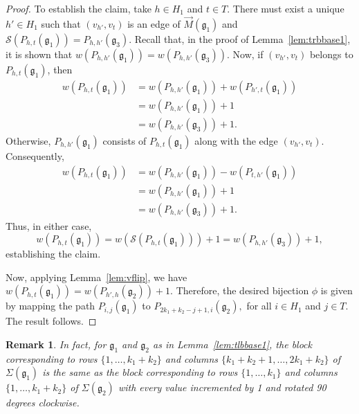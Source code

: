 \documentclass[letterpaper,10pt]{article}
\newtheorem{remark}[theorem]{Remark}
\begin{document}
\begin{proof}
To establish the claim, take $h\in H_1$ and $t\in T$. There must exist a unique $h'\in H_1$ such that $(v_{h'},v_t)$ is an edge of $\overrightarrow{M}(\mathfrak{g}_1)$ and $\mathcal{S}(P_{h,t}(\mathfrak{g}_1))=P_{h,h'}(\mathfrak{g}_3)$. Recall that, in the proof of Lemma~\ref{lem:trbbase1}, it is shown that $w(P_{h,h'}(\mathfrak{g}_1))=w(P_{h,h'}(\mathfrak{g}_3))$. Now, if $(v_{h'},v_t)$ belongs to $P_{h,t}(\mathfrak{g}_1)$, then 
\begin{align*}
    w(P_{h,t}(\mathfrak{g}_1))&=w(P_{h,h'}(\mathfrak{g}_1))+w(P_{h',t}(\mathfrak{g}_1))\\
    &=w(P_{h,h'}(\mathfrak{g}_1))+1\\
    &=w(P_{h,h'}(\mathfrak{g}_3))+1.
\end{align*}
Otherwise, $P_{h,h'}(\mathfrak{g}_1)$ consists of $P_{h,t}(\mathfrak{g}_1)$ along with the edge $(v_{h'},v_t)$. Consequently,
\begin{align*}
    w(P_{h,t}(\mathfrak{g}_1))&=w(P_{h,h'}(\mathfrak{g}_1))-w(P_{t,h'}(\mathfrak{g}_1))\\
    &=w(P_{h,h'}(\mathfrak{g}_1))+1\\
    &=w(P_{h,h'}(\mathfrak{g}_3))+1.
\end{align*}
Thus, in either case, $$w(P_{h,t}(\mathfrak{g}_1))=w(\mathcal{S}(P_{h,t}(\mathfrak{g}_1)))+1=w(P_{h,h'}(\mathfrak{g}_3))+1,$$ establishing the claim. 

Now, applying Lemma~\ref{lem:vflip}, we have $w(P_{h,t}(\mathfrak{g}_1))=w(P_{h',h}(\mathfrak{g}_2))+1$. Therefore, the desired bijection $\phi$ is given by mapping the path $P_{i,j}(\mathfrak{g}_1)$ to $P_{2k_1+k_2-j+1,i}(\mathfrak{g}_2),$ for all $i\in H_1$ and $j\in T.$ The result follows.
\end{proof}

\begin{remark}
In fact, for $\mathfrak{g}_1$ and $\mathfrak{g}_2$ as in Lemma~\ref{lem:tlbbase1}, the block corresponding to rows $\{1,\hdots,k_1+k_2\}$ and columns $\{k_1+k_2+1,\hdots,2k_1+k_2\}$ of $\Sigma(\mathfrak{g}_1)$ is the same as the block corresponding to rows $\{1,\hdots,k_1\}$ and columns $\{1,\hdots,k_1+k_2\}$ of $\Sigma(\mathfrak{g}_2)$ with every value incremented by 1 and rotated 90 degrees clockwise.
\end{remark}
\end{document}
